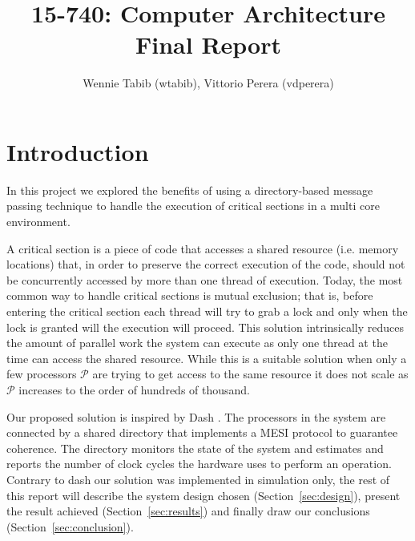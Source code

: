 \documentclass{article}
\title{15-740: Computer Architecture\\
Final Report }
\author{Wennie Tabib (wtabib), Vittorio Perera (vdperera)}
\begin{document}
\maketitle

\section{Introduction}

In this project we explored the benefits of using a directory-based message passing technique to handle the execution of critical sections in a multi core environment.

A critical section is a piece of code that accesses a shared resource (i.e. memory locations) that, in order to preserve the correct execution of the code, should not be concurrently accessed by more than one thread of execution. Today, the most common way to handle critical sections is mutual exclusion; that is, before entering the critical section each thread will try to grab a lock and only when the lock is granted will the execution will proceed. 
This solution intrinsically reduces the amount of parallel work the system can execute as only one thread at the time can access the shared resource. 
While this is a suitable solution when only a few processors $\mathcal{P}$ are trying to get access to the same resource it does not scale as $\mathcal{P}$ increases to the order of hundreds of thousand.

Our proposed solution is inspired by Dash \cite{DASH}. The processors in the system are connected by a shared directory that implements a MESI protocol to guarantee coherence. The directory monitors the state of the system and estimates and reports the number of clock cycles the hardware uses to perform an operation. Contrary to dash our solution was implemented in simulation only, the rest of this report will describe the system design chosen (Section~\ref{sec:design}), present the result achieved (Section~\ref{sec:results}) and finally draw our conclusions (Section~\ref{sec:conclusion}).
\end{document}
